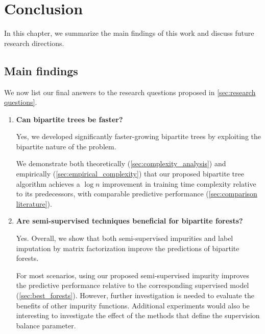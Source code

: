 \chapter{Conclusion}

In this chapter, we summarize the main findings of this work and discuss future research directions.

\section{Main findings}

We now list our final answers to the research questions proposed in \autoref{sec:research questions}.

\begin{enumerate}
    \item \textbf{Can bipartite trees be faster?}

    Yes, we developed significantly faster-growing bipartite trees by exploiting the bipartite nature of the problem.

    We demonstrate both theoretically (\autoref{sec:complexity_analysis}) and empirically (\autoref{sec:empirical_complexity}) that our proposed bipartite tree algorithm achieves a $\log n$ improvement in training time complexity relative to its predecessors, with comparable predictive performance (\autoref{sec:comparison literature}).

    \item \textbf{Are semi-supervised techniques beneficial for bipartite forests?}

    Yes. Overall, we show that both semi-supervised impurities and label imputation by matrix factorization improve the predictions of bipartite forests.%

    For most scenarios, using our proposed semi-supervised impurity improves the predictive performance relative to the corresponding supervised model (\autoref{sec:best_forests}).
    However, further investigation is needed to evaluate the benefits of other impurity functions.
    Additional experiments would also be interesting to investigate the effect of the methods that define the supervision balance parameter.
    

\end{enumerate}

